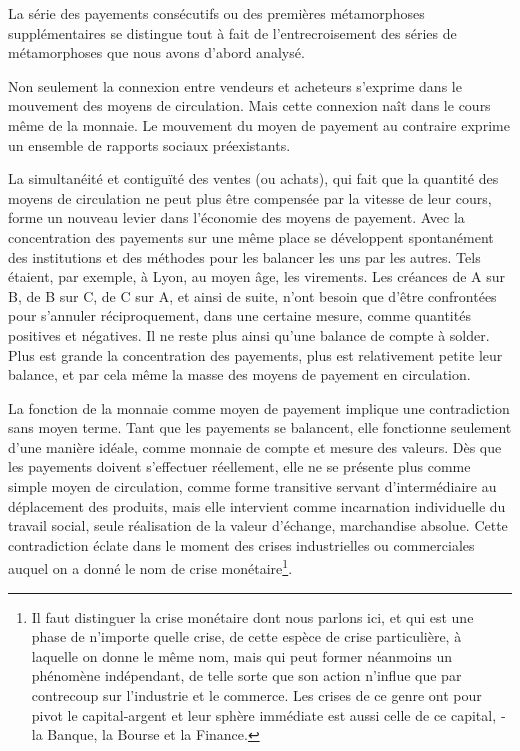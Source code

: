 \documentclass[french,twoside]{book} %
\begin{document}
\noindent La série des payements consécutifs ou des premières métamorphoses supplémentaires se distingue tout à fait de l’entrecroisement des séries de métamorphoses que nous avons d’abord analysé.\par
Non seulement la connexion entre vendeurs et acheteurs s’exprime dans le mouvement des moyens de circulation. Mais cette connexion naît dans le cours même de la monnaie. Le mouvement du moyen de payement au contraire exprime un ensemble de rapports sociaux préexistants.\par
La simultanéité et contiguïté des ventes (ou achats), qui fait que la quantité des moyens de circulation ne peut plus être compensée par la vitesse de leur cours, forme un nouveau levier dans l’économie des moyens de payement. Avec la concentration des payements sur une même place se développent spontanément des institutions et des méthodes pour les balancer les uns par les autres. Tels étaient, par exemple, à Lyon, au moyen âge, les virements. Les créances de A sur B, de B sur C, de C sur A, et ainsi de suite, n’ont besoin que d’être confrontées pour s’annuler réciproquement, dans une certaine mesure, comme quantités positives et négatives. Il ne reste plus ainsi qu’une balance de compte à solder. Plus est grande la concentration des payements, plus est relativement petite leur balance, et par cela même la masse des moyens de payement en circulation.\par
La fonction de la monnaie comme moyen de payement implique une contradiction sans moyen terme. Tant que les payements se balancent, elle fonctionne seulement d’une manière idéale, comme monnaie de compte et mesure des valeurs. Dès que les payements doivent s’effectuer réellement, elle ne se présente plus comme simple moyen de circulation, comme forme transitive servant d’intermédiaire au déplacement des produits, mais elle intervient comme incarnation individuelle du travail social, seule réalisation de la valeur d’échange, marchandise absolue. Cette contradiction éclate dans le moment des crises industrielles ou commerciales auquel on a donné le nom de crise monétaire\footnote{Il faut distinguer la crise monétaire dont nous parlons ici, et qui est une phase de n’importe quelle crise, de cette espèce de crise particulière, à laquelle on donne le même nom, mais qui peut former néanmoins un phénomène indépendant, de telle sorte que son action n’influe que par contrecoup sur l’industrie et le commerce. Les crises de ce genre ont pour pivot le capital‑argent et leur sphère immédiate est aussi celle de ce capital, ‑ la Banque, la Bourse et la Finance.}.\par
\end{document}
